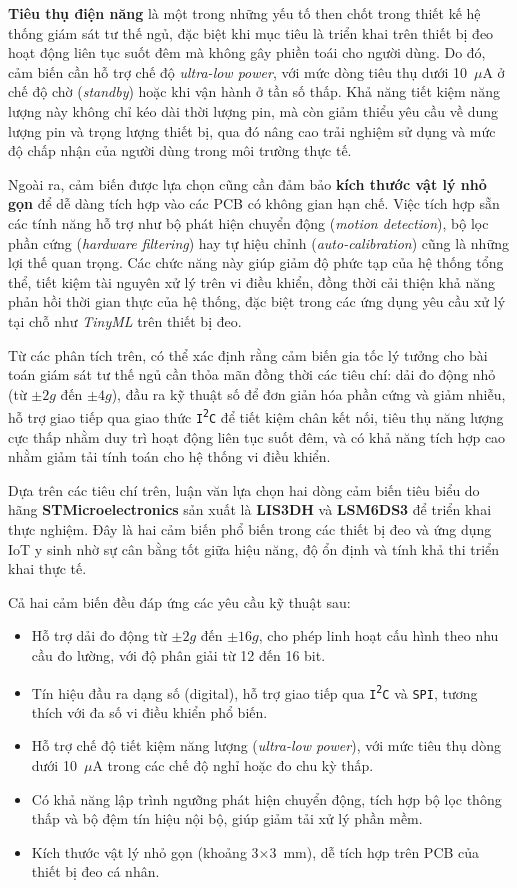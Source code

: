 \textbf{Tiêu thụ điện năng} là một trong những yếu tố then chốt trong thiết kế hệ thống giám sát tư thế ngủ, đặc biệt khi mục tiêu là triển khai trên thiết bị đeo hoạt động liên tục suốt đêm mà không gây phiền toái cho người dùng. Do đó, cảm biến cần hỗ trợ chế độ \textit{ultra-low power}, với mức dòng tiêu thụ dưới 10~$\mu$A ở chế độ chờ (\textit{standby}) hoặc khi vận hành ở tần số thấp. Khả năng tiết kiệm năng lượng này không chỉ kéo dài thời lượng pin, mà còn giảm thiểu yêu cầu về dung lượng pin và trọng lượng thiết bị, qua đó nâng cao trải nghiệm sử dụng và mức độ chấp nhận của người dùng trong môi trường thực tế.

Ngoài ra, cảm biến được lựa chọn cũng cần đảm bảo \textbf{kích thước vật lý nhỏ gọn} để dễ dàng tích hợp vào các PCB có không gian hạn chế. Việc tích hợp sẵn các tính năng hỗ trợ như bộ phát hiện chuyển động (\textit{motion detection}), bộ lọc phần cứng (\textit{hardware filtering}) hay tự hiệu chỉnh (\textit{auto-calibration}) cũng là những lợi thế quan trọng. Các chức năng này giúp giảm độ phức tạp của hệ thống tổng thể, tiết kiệm tài nguyên xử lý trên vi điều khiển, đồng thời cải thiện khả năng phản hồi thời gian thực của hệ thống, đặc biệt trong các ứng dụng yêu cầu xử lý tại chỗ như \textit{TinyML} trên thiết bị đeo.

Từ các phân tích trên, có thể xác định rằng cảm biến gia tốc lý tưởng 
cho bài toán giám sát tư thế ngủ cần thỏa mãn đồng thời các 
tiêu chí: dải đo động nhỏ (từ $\pm2g$ đến $\pm4g$), đầu ra kỹ thuật số để đơn giản hóa phần cứng và giảm nhiễu, hỗ trợ giao tiếp qua giao thức \texttt{I\textsuperscript{2}C} để tiết kiệm chân kết nối, tiêu thụ năng lượng cực thấp nhằm duy trì hoạt động liên tục suốt đêm, và có khả năng tích hợp cao nhằm giảm tải tính toán cho hệ thống vi điều khiển.

Dựa trên các tiêu chí trên, luận văn lựa chọn hai dòng cảm biến tiêu biểu do hãng \textbf{STMicroelectronics} sản xuất là \textbf{LIS3DH} và \textbf{LSM6DS3} để triển khai thực nghiệm. Đây là hai cảm biến phổ biến trong các thiết bị đeo và ứng dụng IoT y sinh nhờ sự cân bằng tốt giữa hiệu năng, độ ổn định và tính khả thi triển khai thực tế.

Cả hai cảm biến đều đáp ứng các yêu cầu kỹ thuật sau:

\begin{itemize}
    \item Hỗ trợ dải đo động từ $\pm2g$ đến $\pm16g$, cho phép linh hoạt cấu hình theo nhu cầu đo lường, với độ phân giải từ 12 đến 16 bit.
    \item Tín hiệu đầu ra dạng số (digital), hỗ trợ giao tiếp qua \texttt{I\textsuperscript{2}C} và \texttt{SPI}, tương thích với đa số vi điều khiển phổ biến.
    \item Hỗ trợ chế độ tiết kiệm năng lượng (\textit{ultra-low power}), với mức tiêu thụ dòng dưới 10~$\mu$A trong các chế độ nghỉ hoặc đo chu kỳ thấp.
    \item Có khả năng lập trình ngưỡng phát hiện chuyển động, tích hợp bộ lọc thông thấp và bộ đệm tín hiệu nội bộ, giúp giảm tải xử lý phần mềm.
    \item Kích thước vật lý nhỏ gọn (khoảng 3×3~mm), dễ tích hợp trên PCB của thiết bị đeo cá nhân.
\end{itemize}


